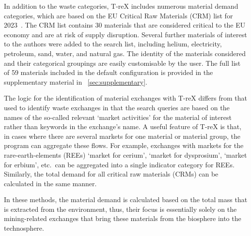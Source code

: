 In addition to the waste categories, T-reX includes numerous material demand categories, which are based on the EU Critical Raw Materials (CRM) list for 2023~\citep{eu2023crmstudy}. The CRM list contains 30 materials that are considered critical to the EU economy and are at risk of supply disruption. Several further materials of interest to the authors were added to the search list, including helium, electricity, petroleum, sand, water, and natural gas. The identity of the materials considered and their categorical groupings are easily customisable by the user. The full list of 59 materials included in the default configuration is provided in the supplementary material in ~\autoref{sec:supplementary}.

The logic for the identification of material exchanges with T-reX differs from that used to identify waste exchanges in that the search queries are based on the names of the so-called relevant `market activities' for the material of interest rather than keywords in the exchange's name. A useful feature of T-reX is that, in cases where there are several markets for one material or material group, the program can aggregate these flows. For example, exchanges with markets for the rare-earth-elements (REEs) `market for cerium', `market for dysprosium', `market for erbium', etc.\ can be aggregated into a single indicator category for REEs. Similarly, the total demand for all critical raw materials (CRMs) can be calculated in the same manner.


In these methods, the material demand is calculated based on the total mass that is extracted from the environment, thus, their focus is essentially solely on the mining-related exchanges that bring these materials from the biosphere into the technosphere.

